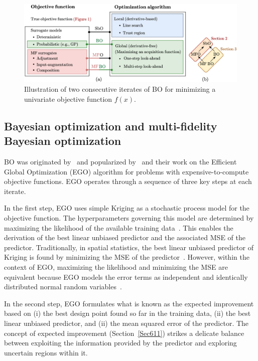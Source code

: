 \documentclass[iicol,sn-basic]{sn-jnl}%
\theoremstyle{thmstyleone}%
\theoremstyle{thmstyletwo}
\theoremstyle{thmstylethree}
\begin{document}
\begin{linenumbers}
\begin{figure}
	\centering
	\includegraphics[scale=0.81]{Fig1.png}
	\caption{ Illustration of two consecutive iterates of BO for minimizing a univariate objective function $f(x)$.}
	\label{Fig1}
\end{figure}

\subsection{Bayesian optimization and multi-fidelity Bayesian optimization}\label{Sec22}

BO was originated by~\cite{Mockus1975} and popularized by~\cite{Jones1998} and their work on the Efficient Global Optimization (EGO) algorithm for problems with expensive-to-compute objective functions.
EGO operates through a sequence of three key steps at each iterate.

In the first step, EGO uses simple Kriging as a stochastic process model for the objective function. The hyperparameters governing this model are determined by maximizing the likelihood of the available training data~\citep{Jones1998}.
This enables the derivation of the best linear unbiased predictor and the associated MSE of the predictor.
Traditionally, in spatial statistics, the best linear unbiased predictor of Kriging is found by minimizing the MSE of the predictor~\citep{Sacks1989,Kleijnen2009}. 
However, within the context of EGO, maximizing the likelihood and minimizing the MSE are equivalent because EGO models the error terms as independent and identically distributed normal random variables~\citep{Jones1998}.

In the second step, EGO formulates what is known as the expected improvement based on (i) the best design point found so far in the training data, (ii) the best linear unbiased predictor, and (ii) the mean squared error of the predictor.
The concept of expected improvement (Section~\ref{Sec611}) strikes a delicate balance between exploiting the information provided by the predictor and exploring uncertain regions within it.


\end{linenumbers}
\end{document}
